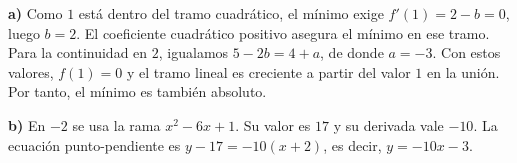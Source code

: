 \textbf{a)} Como $1$ está dentro del tramo cuadrático, el mínimo exige $f'(1)=2-b=0$, luego $b=2$. El coeficiente cuadrático positivo asegura el mínimo en ese tramo. Para la continuidad en $2$, igualamos $5-2b=4+a$, de donde $a=-3$. Con estos valores, $f(1)=0$ y el tramo lineal es creciente a partir del valor $1$ en la unión. Por tanto, el mínimo es también absoluto.

\textbf{b)} En $-2$ se usa la rama $x^2-6x+1$. Su valor es $17$ y su derivada vale $-10$. La ecuación punto-pendiente es $y-17=-10(x+2)$, es decir, $\boxed{y=-10x-3}$.
